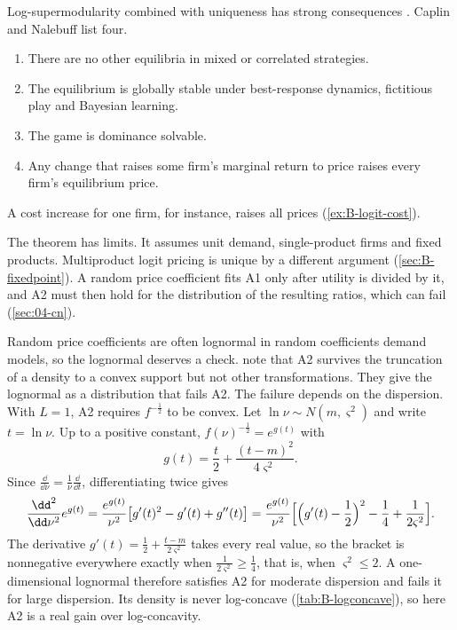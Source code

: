 Log-supermodularity combined with uniqueness has strong consequences \citep{MilgromRoberts1990}. Caplin and
Nalebuff list four.
\begin{enumerate}[label=(\arabic*)]
  \item There are no other equilibria in mixed or correlated strategies.
  \item The equilibrium is globally stable under best-response dynamics, fictitious play and Bayesian learning.
  \item The game is dominance solvable.
  \item Any change that raises some firm's marginal return to price raises every firm's equilibrium price.
\end{enumerate}
A cost increase for one firm, for instance, raises all prices (\cref{ex:B-logit-cost}).

The theorem has limits. It assumes unit demand, single-product firms and fixed products. Multiproduct logit
pricing is unique by a different argument (\cref{sec:B-fixedpoint}). A random price coefficient fits A1 only
after utility is divided by it, and A2 must then hold for the distribution of the resulting ratios, which can fail
(\cref{sec:04-cn}).

Random price coefficients are often lognormal in random coefficients demand models, so the lognormal deserves a
check. \citet[Section 3, p.~6]{CaplinNalebuff1991} note that A2 survives the truncation of a density to a convex
support but not other transformations. They give the lognormal as a distribution that fails A2. The failure
depends on the dispersion. With $L = 1$, A2 requires $f^{-\frac{1}{2}}$ to be convex. Let $\ln\nu \sim N(m,
\varsigma^2)$ and write $t = \ln\nu$. Up to a positive constant, $f(\nu)^{-\frac{1}{2}} = e^{g(t)}$ with
\[
  g(t) = \frac{t}{2} + \frac{(t - m)^2}{4\varsigma^2}.
\]
Since $\frac{\dd}{\dd\nu} = \frac{1}{\nu}\frac{\dd}{\dd t}$, differentiating twice gives
\[
  \frac{\dd^2}{\dd\nu^2}e^{g(t)} = \frac{e^{g(t)}}{\nu^2}\bigl[g'(t)^2 - g'(t) + g''(t)\bigr]
  = \frac{e^{g(t)}}{\nu^2}\Bigl[\Bigl(g'(t) - \frac{1}{2}\Bigr)^2 - \frac{1}{4} + \frac{1}{2\varsigma^2}\Bigr].
\]
The derivative $g'(t) = \frac{1}{2} + \frac{t - m}{2\varsigma^2}$ takes every real value, so the bracket is nonnegative
everywhere exactly when $\frac{1}{2\varsigma^2} \geq \frac{1}{4}$, that is, when $\varsigma^2 \leq 2$. A
one-dimensional lognormal therefore satisfies A2 for moderate dispersion and fails it for large dispersion. Its
density is never log-concave (\cref{tab:B-logconcave}), so here A2 is a real gain over log-concavity.

